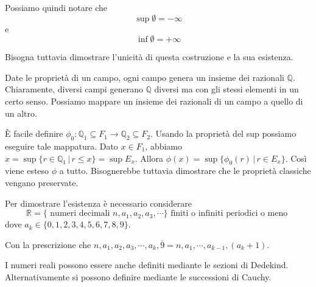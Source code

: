 \documentclass[a4paper]{article}
\begin{document}
Possiamo quindi notare che
\[
    \sup \emptyset = -\infty
\]
e
\[
    \inf \emptyset = +\infty
\]


Bisogna tuttavia dimostrare l'unicità di questa costruzione e la sua esistenza.


Date le proprietà di un campo, ogni campo genera un insieme dei razionali \(\mathbb{Q}\).
Chiaramente, diversi campi generano \(\mathbb{Q}\) diversi ma con gli stessi elementi in un certo senso.
Possiamo mappare un insieme dei razionali di un campo a quello di un altro.

È facile definire \(\phi_0\colon \mathbb{Q}_1 \subseteq F_1 \to \mathbb{Q}_2 \subseteq F_2\).
Usando la proprietà del sup possiamo eseguire tale mappatura.
Dato \(x\in F_1\), abbiamo \(x = \sup \{ r \in \mathbb{Q}_1 \,|\, r \leq x \} = \sup E_x\).
Allora \(\phi (x) = \sup \{ \phi_0(r) \,|\, r \in E_x \}\).
Così viene esteso \(\phi\) a tutto. Bisognerebbe tuttavia dimostrare che le proprietà classiche vengano
preservate.

Per dimostrare l'esistenza è necessario considerare
\[\mathbb{R} = \{ \text{ numeri decimali } n, a_1, a_2, a_3, \cdots \} \text{ finiti o infiniti periodici o meno }\]
dove \(a_k \in \{0,1,2,3,4,5,6,7,8,9\}\).

Con la prescrizione che \(n,a_1, a_2, a_3, \cdots, a_k, \overline{9} = n, a_1, \cdots, a_{k-1}, (a_k+1)\).

I numeri reali possono essere anche definiti mediante le sezioni di Dedekind.
Alternativamente si possono definire mediante le successioni di Cauchy.
\end{document}
